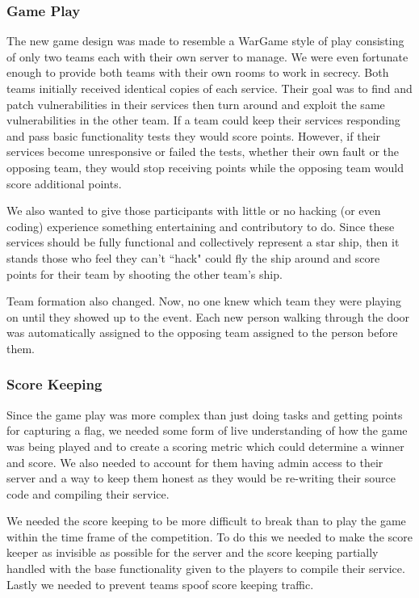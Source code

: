 \documentclass[10pt]{article}
\begin{document}
\subsubsection{Game Play}
\label{stgameplay}
The new game design was made to resemble a WarGame style of play consisting of
only two teams each with their own server to manage. We were even fortunate
enough to provide both teams with their own rooms to work in secrecy. Both
teams initially received identical copies of each service. Their goal was to find
and patch vulnerabilities in their services then turn around and exploit the
same vulnerabilities in the other team. If a team could keep their services
responding and pass basic functionality tests they would score points. However,
if their services become unresponsive or failed the tests, whether their own
fault or the opposing team, they would stop receiving points while the opposing
team would score additional points.

We also wanted to give those participants with little or no hacking (or even
coding) experience something entertaining and contributory to do. Since these
services should be fully functional and collectively represent a star ship, then
it stands those who feel they can't ``hack" could fly the ship around and
score points for their team by shooting the other team's ship.

Team formation also changed. Now, no one knew which team they were playing on
until they showed up to the event. Each new person walking through the door was
automatically assigned to the opposing team assigned to the person before them.

\subsubsection{Score Keeping}
\label{stscorekeeping}
Since the game play was more complex than just doing tasks and getting points
for capturing a flag, we needed some form of live understanding of how the game
was being played and to create a scoring metric which could determine a
winner and score. We also needed to account for them having admin access to
their server and a way to keep them honest as they would be re-writing their
source code and compiling their service.

We needed the score keeping to be more difficult to break than to play the game 
within the time frame of the competition. To do this we needed to make the score keeper
as invisible as possible for the server and the score keeping partially handled with
the base functionality given to the players to compile their service. Lastly we needed
to prevent teams spoof score keeping traffic.
\end{document}
